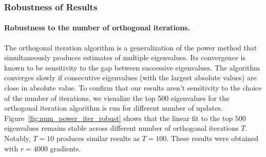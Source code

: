 \subsubsection{Robustness of Results}

\paragraph{Robustness to the number of orthogonal iterations.}
The orthogonal iteration algorithm is a generalization of the power method that simultaneously produces estimates of multiple eigenvalues.
Its convergence is known to be sensitivity to the gap between successive eigenvalues.
The algorithm converges slowly if consecutive eigenvalues (with the largest absolute values) are close in absolute value.
To confirm that our results aren't sensitivity to the choice of the number of iterations, we visualize the top 500 eigenvalues for the orthogonal iteration algorithm is run for different number of updates.
Figure~\ref{fig:num_power_iter_robust} shows that the linear fit to the top $500$ eigenvalues remains stable across different number of orthogonal iterations $T$.
Notably, $T=10$ produces similar results as $T=100$. 
These results were obtained with $r=4000$ gradients.

